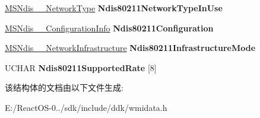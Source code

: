 \begin{DoxyCompactItemize}
\item 
\mbox{\label{struct___m_s_ndis__80211___w_lan_bss_id_afbdd6446454c4bede037793cf369b16d}} 
\hyperlink{struct___m_s_ndis__80211___network_type}{M\+S\+Ndis\+\_\+\_\+\+Network\+Type} {\bfseries Ndis80211\+Network\+Type\+In\+Use}
\item 
\mbox{\label{struct___m_s_ndis__80211___w_lan_bss_id_a50ac420887745b5941dcd50ada5c6cc5}} 
\hyperlink{struct___m_s_ndis__80211___configuration_info}{M\+S\+Ndis\+\_\+\_\+\+Configuration\+Info} {\bfseries Ndis80211\+Configuration}
\item 
\mbox{\label{struct___m_s_ndis__80211___w_lan_bss_id_aa014f1a6fe4bbdbb0975c4efdbe75745}} 
\hyperlink{struct___m_s_ndis__80211___network_infrastructure}{M\+S\+Ndis\+\_\+\_\+\+Network\+Infrastructure} {\bfseries Ndis80211\+Infrastructure\+Mode}
\item 
\mbox{\label{struct___m_s_ndis__80211___w_lan_bss_id_a544ff7cb07c7eb95c261025386c97f3b}} 
U\+C\+H\+AR {\bfseries Ndis80211\+Supported\+Rate} \mbox{[}8\mbox{]}
\end{DoxyCompactItemize}


该结构体的文档由以下文件生成\+:\begin{DoxyCompactItemize}
\item 
E\+:/\+React\+O\+S-\/0../sdk/include/ddk/wmidata.\+h\end{DoxyCompactItemize}
